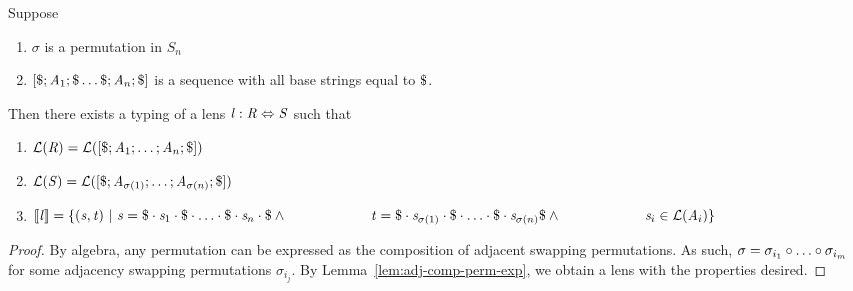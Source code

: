 \documentclass[numbers]{sigplanconf}
\begin{document}
\begin{lemma}
  \label{lem:perm-exp}
  Suppose
  \begin{enumerate}
  \item $\sigma$ is a permutation in $S_n$
  \item $[\$;\mathit{A}_1;\$\ldots\$;\mathit{A}_n;\$]$ is a sequence with
    all base strings equal to $\Sep$.
  \end{enumerate}
  Then there exists a typing of a lens $\mathit{l} : \mathit{R} \Leftrightarrow \mathit{S}$ such that
  \begin{enumerate}
  \item $\mathcal{L}(\mathit{R})=\mathcal{L}([\$;\mathit{A}_1;\ldots;\mathit{A}_n;\$])$
  \item $\mathcal{L}(\mathit{S})=\mathcal{L}([\$;\mathit{A}_{\sigma(1)};\ldots;\mathit{A}_{\sigma(n)};\$])$
  \item $[ \! [\mathit{l}] \! ]=
    \{(\mathit{s},\mathit{t})~|~\mathit{s}=\$\cdot\mathit{s}_1\cdot\$\cdot\ldots\cdot\$\cdot\mathit{s}_n\cdot\$
      \wedge\\
      \hspace*{6em}\mathit{t}=\$\cdot\mathit{s}_{\sigma(1)}\cdot\$\cdot\ldots\cdot\$\cdot\mathit{s}_{\sigma(n)}\$\wedge\\
      \hspace*{6em}\mathit{s}_i\in\mathcal{L}(\mathit{A}_i)\}$
  \end{enumerate}
\end{lemma}
\begin{proof}
  By algebra, any permutation can be expressed as the composition of adjacent swapping permutations.
  As such, $\sigma=\sigma_{i_1}\circ\ldots\circ\sigma_{i_m}$ for some adjacency swapping
  permutations $\sigma_{i_j}$.
  By Lemma~\ref{lem:adj-comp-perm-exp}, we obtain a lens with the properties desired.
\end{proof}
\end{document}
